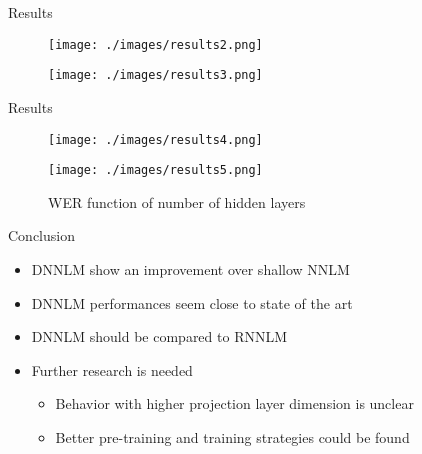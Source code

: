\documentclass{beamer}
\begin{document}
\begin{frame}{Results}
	\begin{figure}[!htb]
		\centering
			\begin{minipage}{0.45\textwidth}
				    \texttt{[image: ./images/results2.png]}
			\end{minipage}
			\hspace{5mm}
			\begin{minipage}{0.45\textwidth}
				    \texttt{[image: ./images/results3.png]}
			\end{minipage}
	\end{figure}
\end{frame}

\begin{frame}{Results}
	\begin{figure}[!htb]
		\centering
			\begin{minipage}{0.45\textwidth}
				    \texttt{[image: ./images/results4.png]}
			\end{minipage}
			\hspace{5mm}
			\begin{minipage}{0.45\textwidth}
				    \texttt{[image: ./images/results5.png]}
			\end{minipage}
		\caption{WER function of number of hidden layers}
	\end{figure}
\end{frame}

\begin{frame}{Conclusion}
	\begin{itemize}
		\item DNNLM show an improvement over shallow NNLM
		\item DNNLM performances seem close to state of the art
		\item DNNLM should be compared to RNNLM
		\item Further research is needed
		\begin{itemize}
			\item Behavior with higher projection layer dimension is unclear
			\item Better pre-training and training strategies could be found
		\end{itemize}
	\end{itemize}
\end{frame}
\end{document}
